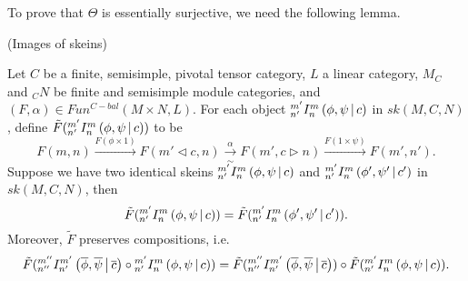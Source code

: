 \noindent To prove that $\Theta$ is essentially surjective, we need the following
lemma.

\begin{lemma} (Images of skeins) \label{lemma/image-of-skein}

  \noindent
  Let $C$ be a finite, semisimple, pivotal tensor category, $L$ a linear
  category, $M_{C}$ and $_{C}N$ be finite and semisimple module categories,
  and $(F,\alpha) \in Fun^{C-bal}(M \times N, L)$. For each object
  ${}^{m'}_{n'} I^{m}_{n} \left( \phi, \psi \,\middle|\, c \right)$ in $sk(M,C,N)$, define
  $\tilde{F}({}^{m'}_{n'} I^{m}_{n} \left( \phi, \psi \,\middle|\, c \right))$ to be
  \[
    F(m,n)
    \xrightarrow{F(\phi \times 1)}
    F(m' \lhd c, n)
    \xrightarrow[\sim]{\alpha}
    F(m', c \rhd n)
    \xrightarrow{F(1 \times \psi)}
    F(m',n').
  \]
  Suppose we have two identical skeins ${}^{m'}_{n'} I^{m}_{n} \left( \phi, \psi \,\middle|\, c \right)$ and $ {}^{m'}_{n'} I^{m}_{n} \left( \phi', \psi' \,\middle|\, c' \right)$ in
  $sk(M,C,N)$, then
  \[
    \tilde{F}({}^{m'}_{n'} I^{m}_{n} \left( \phi, \psi \,\middle|\, c \right)) = \tilde{F}({}^{m'}_{n'} I^{m}_{n} \left( \phi', \psi' \,\middle|\, c' \right)).
  \]
  Moreover, $\tilde{F}$ preserves compositions, i.e.
  \[
    \tilde{F}({}^{m''}_{n''} I^{m'}_{n'} \left( \overline{\phi}, \overline{\psi} \,\middle|\, \overline{c} \right) \circ {}^{m'}_{n'} I^{m}_{n} \left( \phi, \psi \,\middle|\, c \right))
    = \tilde{F}({}^{m''}_{n''} I^{m'}_{n'} \left( \overline{\phi}, \overline{\psi} \,\middle|\, \overline{c} \right))
    \circ
    \tilde{F}({}^{m'}_{n'} I^{m}_{n} \left( \phi, \psi \,\middle|\, c \right)).
  \]
\end{lemma}


